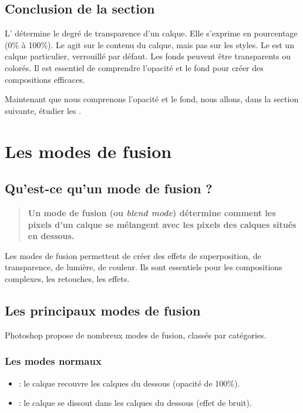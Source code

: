 \subsection*{Conclusion de la section}

L' détermine le degré de transparence d'un calque. Elle s'exprime en pourcentage (0\% à 100\%). Le  agit sur le contenu du calque, mais pas sur les styles. Le  est un calque particulier, verrouillé par défaut. Les fonds peuvent être transparents ou colorés. Il est essentiel de comprendre l'opacité et le fond pour créer des compositions efficaces.

Maintenant que nous comprenons l'opacité et le fond, nous allons, dans la section suivante, étudier les .

\section{Les modes de fusion}

\subsection{Qu'est-ce qu'un mode de fusion ?}

\begin{quote}
\textbf{Un mode de fusion (ou \emph{blend mode}) détermine comment les pixels d'un calque se mélangent avec les pixels des calques situés en dessous.}
\end{quote}

Les modes de fusion permettent de créer des effets de superposition, de transparence, de lumière, de couleur. Ils sont essentiels pour les compositions complexes, les retouches, les effets.

\subsection{Les principaux modes de fusion}

Photoshop propose de nombreux modes de fusion, classés par catégories.

\subsubsection{Les modes normaux}

\begin{itemize}
    \item {} : le calque recouvre les calques du dessous (opacité de 100\%).
    \item {} : le calque se dissout dans les calques du dessous (effet de bruit).
\end{itemize}

